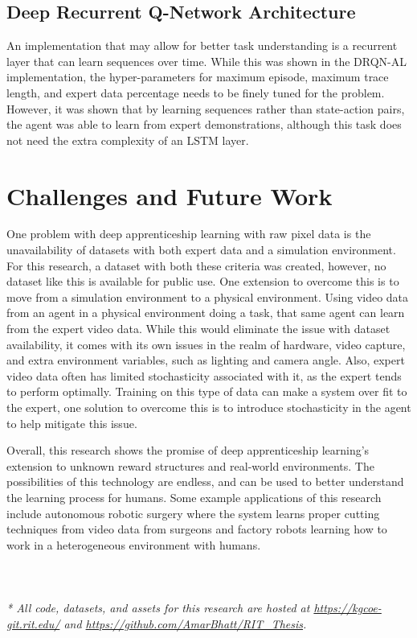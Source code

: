 \documentclass[12pt,american]{report}
\begin{document}
\subsection{Deep Recurrent Q-Network Architecture}
An implementation that may allow for better task understanding is a recurrent layer that can learn sequences over time.  While this was shown in the DRQN-AL implementation, the hyper-parameters for maximum episode, maximum trace length, and expert data percentage needs to be finely tuned for the problem.  However, it was shown that by learning sequences rather than state-action pairs, the agent was able to learn from expert demonstrations, although this task does not need the extra complexity of an LSTM layer. 

\section{Challenges and Future Work}
One problem with deep apprenticeship learning with raw pixel data is the unavailability of datasets with both expert data and a simulation environment.  For this research, a dataset with both these criteria was created, however, no dataset like this is available for public use.  One extension to overcome this is to move from a simulation environment to a physical environment.  Using video data from an agent in a physical environment doing a task, that same agent can learn from the expert video data.  While this would eliminate the issue with dataset availability, it comes with its own issues in the realm of hardware, video capture, and extra environment variables, such as lighting and camera angle.  Also, expert video data often has limited stochasticity associated with it, as the expert tends to perform optimally.  Training on this type of data can make a system over fit to the expert, one solution to overcome this is to introduce stochasticity in the agent to help mitigate this issue.

Overall, this research shows the promise of deep apprenticeship learning's extension to unknown reward structures and real-world environments. The possibilities of this technology are endless, and can be used to better understand the learning process for humans.  Some example applications of this research include autonomous robotic surgery where the system learns proper cutting techniques from video data from surgeons and factory robots learning how to work in a heterogeneous environment with humans. 
\\
\\
\\
\\
\textit{* All code, datasets, and assets for this research are hosted at \url{https://kgcoe-git.rit.edu/} and \url{https://github.com/AmarBhatt/RIT_Thesis}.}
\end{document}
